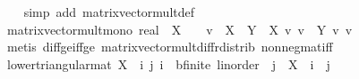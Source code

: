 \begin{isabellebody}
%
\isadelimproof
\ \ %
\endisadelimproof
%
\isatagproof
{}\isamarkupfalse%
\ {\isacharparenleft}{\kern0pt}simp\ add{\isacharcolon}{\kern0pt}\ matrix{\isacharunderscore}{\kern0pt}vector{\isacharunderscore}{\kern0pt}mult{\isacharunderscore}{\kern0pt}def{\isacharparenright}{\kern0pt}%
\endisatagproof
{\isafoldproof}%
%
\isadelimproof
\isanewline
%
\endisadelimproof
\isanewline
{}\isamarkupfalse%
\ matrix{\isacharunderscore}{\kern0pt}vector{\isacharunderscore}{\kern0pt}mult{\isacharunderscore}{\kern0pt}mono{\isacharcolon}{\kern0pt}\ {\isachardoublequoteopen}{\isacharparenleft}{\kern0pt}{}{\isacharcolon}{\kern0pt}{\isacharcolon}{\kern0pt}real{\isacharcircum}{\kern0pt}{\isacharunderscore}{\kern0pt}{\isacharcircum}{\kern0pt}{\isacharunderscore}{\kern0pt}{\isacharparenright}{\kern0pt}\ {\isasymle}\ X\ {\isasymLongrightarrow}\ {}\ {\isasymle}\ v\ {\isasymLongrightarrow}\ X\ {\isasymle}\ Y\ {\isasymLongrightarrow}\ X\ {\isacharasterisk}{\kern0pt}v\ v\ {\isasymle}\ Y\ {\isacharasterisk}{\kern0pt}v\ v{\isachardoublequoteclose}\isanewline
%
\isadelimproof
\ \ %
\endisadelimproof
%
\isatagproof
{}\isamarkupfalse%
\ {\isacharparenleft}{\kern0pt}metis\ diff{\isacharunderscore}{\kern0pt}ge{\isacharunderscore}{\kern0pt}{}{\isacharunderscore}{\kern0pt}iff{\isacharunderscore}{\kern0pt}ge\ matrix{\isacharunderscore}{\kern0pt}vector{\isacharunderscore}{\kern0pt}mult{\isacharunderscore}{\kern0pt}diff{\isacharunderscore}{\kern0pt}rdistrib\ nonneg{\isacharunderscore}{\kern0pt}mat{\isacharunderscore}{\kern0pt}iff{\isacharparenright}{\kern0pt}%
\endisatagproof
{\isafoldproof}%
%
\isadelimproof
%
\endisadelimproof
%
\isadelimdocument
%
\endisadelimdocument
%
\isatagdocument
%
\isamarkuptrue%
%
\endisatagdocument
{\isafolddocument}%
%
\isadelimdocument
%
\endisadelimdocument
{}\isamarkupfalse%
\ {\isachardoublequoteopen}lower{\isacharunderscore}{\kern0pt}triangular{\isacharunderscore}{\kern0pt}mat\ X\ {\isasymlongleftrightarrow}\ {\isacharparenleft}{\kern0pt}{\isasymforall}i\ j{\isachardot}{\kern0pt}\ {\isacharparenleft}{\kern0pt}i\ {\isacharcolon}{\kern0pt}{\isacharcolon}{\kern0pt}\ {\isacharprime}{\kern0pt}b{\isacharcolon}{\kern0pt}{\isacharcolon}{\kern0pt}{\isacharbraceleft}{\kern0pt}finite{\isacharcomma}{\kern0pt}\ linorder{\isacharbraceright}{\kern0pt}{\isacharparenright}{\kern0pt}\ {\isacharless}{\kern0pt}\ j\ {\isasymlongrightarrow}\ X\ {\isachardollar}{\kern0pt}\ i\ {\isachardollar}{\kern0pt}\ j\ {\isacharequal}{\kern0pt}\ {}{\isacharparenright}{\kern0pt}{\isachardoublequoteclose}\isanewline

\end{isabellebody}
